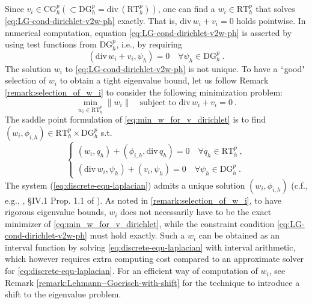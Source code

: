 \documentclass[a4,11pt]{article}
\numberwithin{equation}{section}
\newcommand{\Div}{\mbox{div}\mspace{3mu}}
\begin{document}
Since $v_{i}\in \text{CG}^p_h(\subset \text{DG}_h^p=\Div (\text{RT}^p_h))$, 
one can find a $w_i\in \text{RT}^p_h$ that solves \eqref{eq:LG-cond-dirichlet-v2w-ph}  exactly. That is, $\Div w_i +v_{i}=0$ holds pointwise.
In numerical computation, equation \eqref{eq:LG-cond-dirichlet-v2w-ph} is asserted by using test functions from $\text{DG}^p_h$, i.e., by requiring
$$
(\Div w_i + v_{i},\psi_h) =0\quad \forall \psi_h \in \text{DG}^p_h\:.
$$
%
The solution $w_i$ to \eqref{eq:LG-cond-dirichlet-v2w-ph} is not unique.
To have a ``good" selection of $w_i$ to obtain a tight eigenvalue bound, let us follow Remark \ref{remark:selection_of_w_i} to consider the following minimization problem:
\begin{equation}
	\label{eq:min_w_for_v_dirichlet}
\min_{w_i\in \text{RT}_h^p } \|w_i\| \quad \text{subject to } 
\Div w_i+ v_{i} = 0~.
\end{equation}
The saddle point formulation of \eqref{eq:min_w_for_v_dirichlet} is to find $(w_i,\phi_{i,h})  \in \text{RT}_h^p \times \text{DG}^p_h$ s.t.
%
\begin{equation}
\label{eq:discrete-equ-laplacian}
\left\{
\begin{array}{l}
(w_i, q_h) + (\phi_{i,h},\Div q_h)=0\quad \forall q_h \in \text{RT}_h^p~,\\
(\Div w_i, \psi_h) + (v_{i},\psi_h) =0\quad \forall \psi_h \in \text{DG}^p_h~.
\end{array}
\right.
\end{equation}
%
The system (\ref{eq:discrete-equ-laplacian}) admits a unique solution $(w_i, \phi_{i,h})$ (c.f., e.g., \cite{Arnold+F.Brezzi1985}, \S IV.1 Prop. 1.1 of \cite{Brezzi+Fortin1991}). As noted in \cref{remark:selection_of_w_i}, to have rigorous eigenvalue bounds, $w_i$ does not necessarily  have to be the exact minimizer of \cref{eq:min_w_for_v_dirichlet}, while the constraint condition \cref{eq:LG-cond-dirichlet-v2w-ph}  must hold exactly. Such a $w_i$ can be obtained as an interval function  by solving \cref{eq:discrete-equ-laplacian} with  interval arithmetic, which however requires extra computing cost compared to an approximate  solver for \cref{eq:discrete-equ-laplacian}. For an efficient way of computation of $w_i$, see Remark \ref{remark:Lehmann--Goerisch-with-shift} for the technique  to introduce a shift to the eigenvalue problem.
\end{document}

